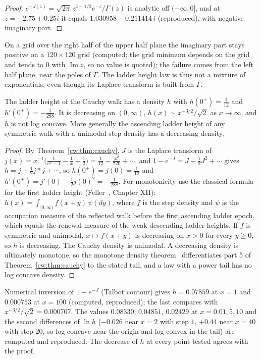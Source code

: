\begin{proof}
$e^{-J(z)}=\sqrt{2\pi}\,z^{z-1/2}e^{-z}/\Gamma(z)$ is analytic off $(-\infty,0]$, and at $z=-2.75+0.25i$ it equals $1.030958-0.211414\,i$ (reproduced), with negative imaginary part.
\end{proof}

On a grid over the right half of the upper half plane the imaginary part stays positive on a $120\times120$ grid (computed; the grid minimum depends on the grid and tends to $0$ with $\operatorname{Im}z$, so no value is quoted); the failure comes from the left half plane, near the poles of $\Gamma$. The ladder height law is thus not a mixture of exponentials, even though its Laplace transform is built from $\Gamma$.

\begin{proposition}[proved]\label{cw:prop:density}
The ladder height of the Cauchy walk has a density $h$ with $h(0^+)=\frac1{12}$ and $h'(0^+)=-\frac1{288}$. It is decreasing on $(0,\infty)$, $h(x)\sim x^{-3/2}/\sqrt2$ as $x\to\infty$, and $h$ is not log concave. More generally the ascending ladder height of any symmetric walk with a unimodal step density has a decreasing density.
\end{proposition}

\begin{proof}
By Theorem~\ref{cw:thm:cauchy}, $J$ is the Laplace transform of $j(x)=x^{-1}\big(\frac1{e^x-1}-\frac1x+\frac12\big)=\frac1{12}-\frac{x^2}{720}+\cdots$, and $1-e^{-J}=J-\frac12J^2+\cdots$ gives $h=j-\frac12j*j+\cdots$, so $h(0^+)=j(0)=\frac1{12}$ and $h'(0^+)=j'(0)-\frac12j(0)^2=-\frac1{288}$. For monotonicity use the classical formula for the first ladder height (Feller~\cite{Feller71}, Chapter XII): $h(x)=\int_{[0,\infty)}f(x+y)\,\psi(dy)$, where $f$ is the step density and $\psi$ is the occupation measure of the reflected walk before the first ascending ladder epoch, which equals the renewal measure of the weak descending ladder heights. If $f$ is symmetric and unimodal, $x\mapsto f(x+y)$ is decreasing on $x>0$ for every $y\ge0$, so $h$ is decreasing. The Cauchy density is unimodal. A decreasing density is ultimately monotone, so the monotone density theorem~\cite{BGT87} differentiates part 5 of Theorem~\ref{cw:thm:cauchy} to the stated tail, and a law with a power tail has no log concave density.
\end{proof}

Numerical inversion of $1-e^{-J}$ (Talbot contour) gives $h=0.07859$ at $x=1$ and $0.000753$ at $x=100$ (computed, reproduced); the last compares with $x^{-3/2}/\sqrt2=0.000707$. The values $0.08330$, $0.04851$, $0.02429$ at $x=0.01,5,10$ and the second differences of $\ln h$ ($-0.026$ near $x=2$ with step $1$, $+0.44$ near $x=40$ with step $20$, so log concave near the origin and log convex in the tail) are computed and reproduced.
The decrease of $h$ at every point tested agrees with the proof.

